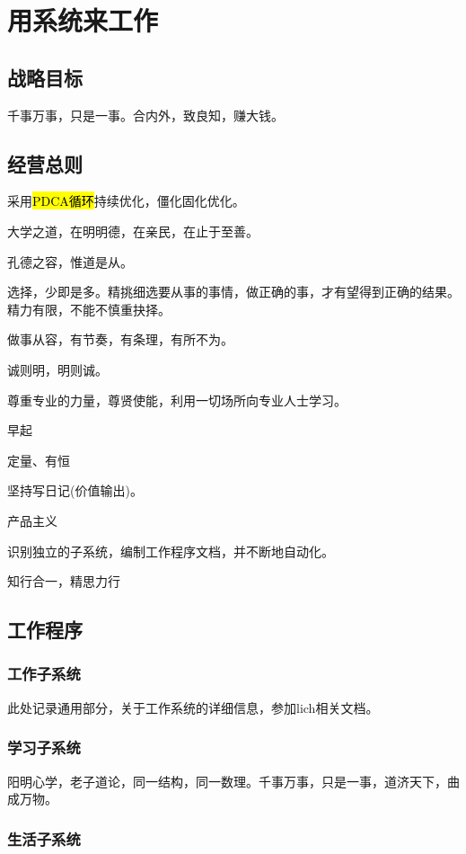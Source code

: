 \chapter{用系统来工作}

\section{战略目标}

千事万事，只是一事。合内外，致良知，赚大钱。

\section{经营总则}

采用\hl{PDCA循环}持续优化，僵化固化优化。

大学之道，在明明德，在亲民，在止于至善。

孔德之容，惟道是从。

选择，少即是多。精挑细选要从事的事情，做正确的事，才有望得到正确的结果。
精力有限，不能不慎重抉择。

做事从容，有节奏，有条理，有所不为。

诚则明，明则诚。

尊重专业的力量，尊贤使能，利用一切场所向专业人士学习。

早起

定量、有恒

坚持写日记(价值输出)。

产品主义

识别独立的子系统，编制工作程序文档，并不断地自动化。

知行合一，精思力行

\section{工作程序}

\subsection{工作子系统}

此处记录通用部分，关于工作系统的详细信息，参加lich相关文档。

\subsection{学习子系统}

阳明心学，老子道论，同一结构，同一数理。千事万事，只是一事，道济天下，曲成万物。

\subsection{生活子系统}
